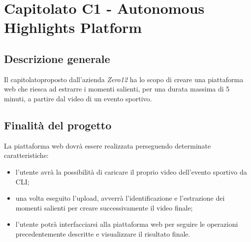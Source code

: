 \section{Capitolato C1 - Autonomous Highlights Platform}

\subsection{Descrizione generale}
Il capitolato\glo proposto dall'azienda \textit{Zero12} ha lo scopo di creare una piattaforma web che riesca ad estrarre i momenti salienti, per una durata massima di 5 minuti, a partire dal video di un evento sportivo.

\subsection{Finalità del progetto}
La piattaforma web dovrà essere realizzata perseguendo determinate caratteristiche:
\begin{itemize}
	\item l'utente avrà la possibilità di caricare il proprio video dell'evento sportivo da CLI\glos;
	\item una volta eseguito l'upload\glos, avverrà l'identificazione e l'estrazione dei momenti salienti per creare successivamente il video finale;
	\item l'utente potrà interfacciarsi alla piattaforma web per seguire le operazioni precedentemente descritte e visualizzare il risultato finale.
\end{itemize}


